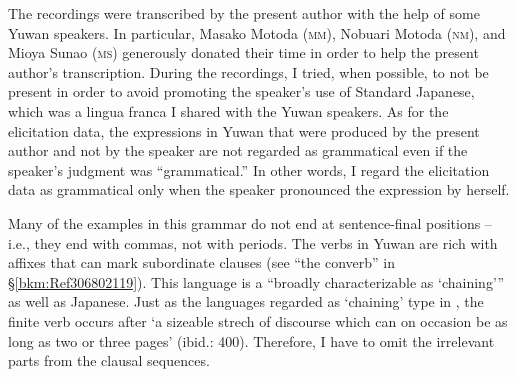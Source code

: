 \begin{table}
\caption{\label{tab:key:3}Information about the Yuwan speakers}
\end{table}


The recordings were transcribed by the present author with the help of some Yuwan speakers. In particular, Masako Motoda (\textsc{mm}), Nobuari Motoda (\textsc{nm}), and Mioya Sunao (\textsc{ms}) generously donated their time in order to help the present author’s transcription. During the recordings, I tried, when possible, to not be present in order to avoid promoting the speaker’s use of Standard Japanese, which was a lingua franca I shared with the Yuwan speakers. As for the elicitation data, the expressions in Yuwan that were produced by the present author and not by the speaker are not regarded as grammatical even if the speaker’s judgment was “grammatical.” In other words, I regard the elicitation data as grammatical only when the speaker pronounced the expression by herself.

Many of the examples in this grammar do not end at sentence-final positions -- i.e., they end with commas, not with periods. The verbs in Yuwan are rich with affixes that can mark subordinate clauses (see “the converb” in §\ref{bkm:Ref306802119}). This language is a “broadly characterizable as ‘chaining’” \citep[399]{Longacre2007} as well as Japanese. Just as the languages regarded as ‘chaining’ type in \citet{Longacre2007}, the finite verb occurs after ‘a sizeable strech of discourse which can on occasion be as long as two or three pages’ (ibid.: 400). Therefore, I have to omit the irrelevant parts from the clausal sequences.

